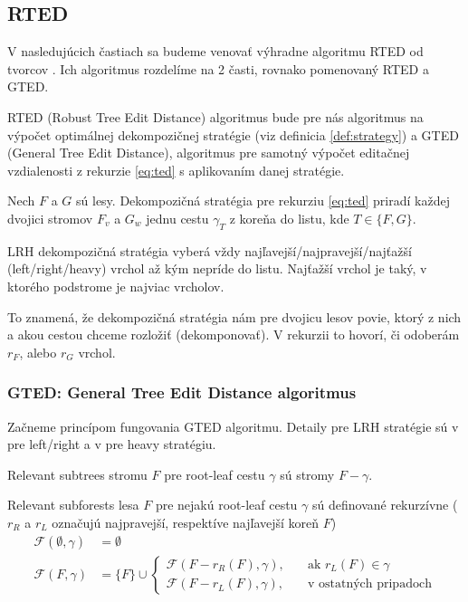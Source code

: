 \subsection{RTED}

V nasledujúcich častiach sa budeme venovať výhradne algoritmu RTED od tvorcov \citet{RTED}.
Ich algoritmus rozdelíme na 2 časti, rovnako pomenovaný RTED a GTED.

RTED (Robust Tree Edit Distance) algoritmus bude pre nás algoritmus na výpočet
optimálnej dekompozičnej stratégie (viz definicia \ref{def:strategy})
a GTED (General Tree Edit Distance), algoritmus pre samotný výpočet editačnej
vzdialenosti z rekurzie \ref{eq:ted} s aplikovaním danej stratégie.

\begin{definice}
  \label{def:strategy}
	Nech $F$ a $G$ sú lesy. Dekompozičná stratégia pre rekurziu \ref{eq:ted} priradí
  každej dvojici stromov $F_{v}$ a $G_{w}$ jednu cestu $\gamma_{T}$
  z koreňa do listu, kde $T \in \{F, G\}$.

	LRH dekompozičná stratégia vyberá vždy najľavejší/najpravejší/najťažší
	(left/right/heavy) vrchol až kým nepríde do listu. Najťažší vrchol je taký,
	v ktorého podstrome je najviac vrcholov. 
\end{definice}

To znamená, že dekompozičná stratégia nám pre dvojicu lesov povie,
ktorý z nich a akou cestou chceme rozložiť (dekomponovať).
V rekurzii to hovorí, či odoberám $r_{F}$, alebo $r_{G}$ vrchol.




\subsubsection{GTED: General Tree Edit Distance algoritmus}

Začneme princípom fungovania GTED algoritmu. Detaily pre LRH stratégie sú
v \citet{ZHANGSHASHA} pre left/right a v \citet{DMRW} pre heavy stratégiu.

\begin{definice}
  \label{def:relevant_subforests}
	Relevant subtrees stromu $F$ pre root-leaf cestu $\gamma$ sú stromy $F - \gamma$.

	Relevant subforests lesa $F$ pre nejakú root-leaf cestu $\gamma$ sú definované rekurzívne
  ($r_{R}$ a $r_{L}$ označujú najpravejší, respektíve najľavejší koreň $F$)
	\begin{align*}
    \mathcal{F}(\emptyset, \gamma) &= \emptyset
		\\
		\mathcal{F}(F, \gamma) &= \{F\} \cup
		\begin{cases}
      \mathcal{F}(F - r_{R}(F), \gamma), \quad{} &\text{ak $r_{L}(F) \in \gamma$}
			\\
      \mathcal{F}(F - r_{L}(F), \gamma), &\text{v ostatných pripadoch}
		\end{cases}
	\end{align*}
\end{definice}

